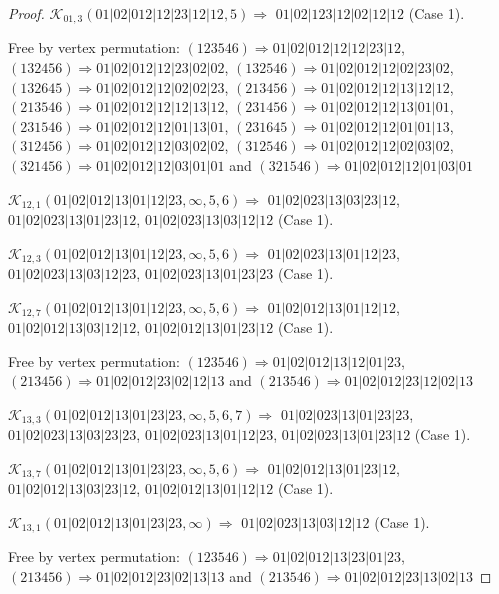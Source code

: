 \documentclass[12pt]{article}
\theoremstyle{plain}
\theoremstyle{definition}
\theoremstyle{remark}
\newcommand{\fancy}[1]{\mathcal{#1}}
\def\K{\fancy{K}}
\begin{document}
\begin{proof}
	$\K_{01,3}(01|02|012|12|23|12|12,5)\Rightarrow $ $01|02|123|12|02|12|12$ (Case 1).
	
	
	
	Free by vertex permutation: $(1 2 3 5 4 6)\Rightarrow 01|02|012|12|12|23|12$, $(1 3 2 4 5 6)\Rightarrow 01|02|012|12|23|02|02$, $(1 3 2 5 4 6)\Rightarrow 01|02|012|12|02|23|02$, $(1 3 2 6 4 5)\Rightarrow 01|02|012|12|02|02|23$, $(2 1 3 4 5 6)\Rightarrow 01|02|012|12|13|12|12$, $(2 1 3 5 4 6)\Rightarrow 01|02|012|12|12|13|12$, $(2 3 1 4 5 6)\Rightarrow 01|02|012|12|13|01|01$, $(2 3 1 5 4 6)\Rightarrow 01|02|012|12|01|13|01$, $(2 3 1 6 4 5)\Rightarrow 01|02|012|12|01|01|13$, $(3 1 2 4 5 6)\Rightarrow 01|02|012|12|03|02|02$, $(3 1 2 5 4 6)\Rightarrow 01|02|012|12|02|03|02$, $(3 2 1 4 5 6)\Rightarrow 01|02|012|12|03|01|01$ and $(3 2 1 5 4 6)\Rightarrow 01|02|012|12|01|03|01$
	
	
	
	\bigskip
	
	$\K_{12,1}(01|02|012|13|01|12|23,\infty,5, 6)\Rightarrow $ $01|02|023|13|03|23|12$, $01|02|023|13|01|23|12$, $01|02|023|13|03|12|12$ (Case 1).
	
	$\K_{12,3}(01|02|012|13|01|12|23,\infty,5, 6)\Rightarrow $ $01|02|023|13|01|12|23$, $01|02|023|13|03|12|23$, $01|02|023|13|01|23|23$ (Case 1).
	
	$\K_{12,7}(01|02|012|13|01|12|23,\infty,5, 6)\Rightarrow $ $01|02|012|13|01|12|12$, $01|02|012|13|03|12|12$, $01|02|012|13|01|23|12$ (Case 1).
	
	
	
	Free by vertex permutation: $(1 2 3 5 4 6)\Rightarrow 01|02|012|13|12|01|23$, $(2 1 3 4 5 6)\Rightarrow 01|02|012|23|02|12|13$ and $(2 1 3 5 4 6)\Rightarrow 01|02|012|23|12|02|13$
	
	
	
	\bigskip
	
	$\K_{13,3}(01|02|012|13|01|23|23,\infty,5, 6, 7)\Rightarrow $ $01|02|023|13|01|23|23$, $01|02|023|13|03|23|23$, $01|02|023|13|01|12|23$, $01|02|023|13|01|23|12$ (Case 1).
	
	$\K_{13,7}(01|02|012|13|01|23|23,\infty,5, 6)\Rightarrow $ $01|02|012|13|01|23|12$, $01|02|012|13|03|23|12$, $01|02|012|13|01|12|12$ (Case 1).
	
	$\K_{13,1}(01|02|012|13|01|23|23,\infty)\Rightarrow $ $01|02|023|13|03|12|12$ (Case 1).
	
	
	
	Free by vertex permutation: $(1 2 3 5 4 6)\Rightarrow 01|02|012|13|23|01|23$, $(2 1 3 4 5 6)\Rightarrow 01|02|012|23|02|13|13$ and $(2 1 3 5 4 6)\Rightarrow 01|02|012|23|13|02|13$
	

\end{proof}
\end{document}
